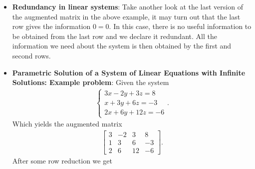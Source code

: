 \documentclass{report}
\begin{document}
\begin{itemize}
\begin{align*}
                        \begin{array}{ccc|c}
                            1 & 2 & 6 & 5 \\
                            0 & 1 & \frac{4}{3} & \frac{8}{3} \\
                            0 & 0 & 0  &12
                        \end{array}
                    \right]
                .\end{align*}
                We notice that this last row implies $0=12$. Thus we assert this row is inconsistent, which implies the entire system is inconsistent, and thus the solution set is 
                \begin{align*}
                    S = \varnothing
                .\end{align*}
        \item \textbf{Redundancy in linear systems}: Take another look at the last version of the augmented matrix in the above example, it may turn out that the last row gives the information $0=0$. In this case, there is no useful information to be obtained from the last row and we declare it redundant. All the information we need about the system is then obtained by the first and second rows.
        \item \textbf{Parametric Solution of a System of Linear Equations with Infinite Solutions: Example problem}:
            \bigbreak \noindent 
            Given the system
            \begin{align*}
               \begin{cases}
                  3x -2y + 3z = 8 \\
                  x + 3y + 6z = -3 \\
                  2x + 6y + 12z = -6
               \end{cases}
            .\end{align*}
            Which yields the augmented matrix
            \begin{align*}
                \left[
                    \begin{array}{ccc|c}
                        3 & -2 & 3  & 8 \\
                        1 & 3 & 6 & -3 \\
                        2 & 6 & 12 & -6
                    \end{array}
                \right]
            .\end{align*}
            After some row reduction we get
            \begin{align*}

\end{align*}
\end{itemize}
\end{document}
